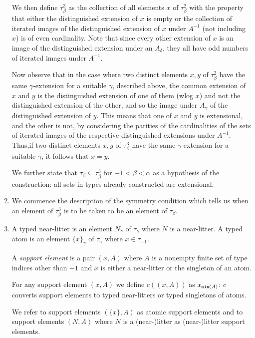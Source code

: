 \documentclass[12pt]{article}
\begin{document}
\begin{enumerate}
We then define $\tau^3_\beta$ as the collection of all elements $x$ of $\tau^2_\beta$ with the property that either the distinguished extension of $x$ is empty or the collection of iterated images of the distinguished extension of
$x$ under $A^{-1}$ (not including $x$) is of even cardinality.  Note that since every other extension of $x$ is an image of the distinguished extension under an $A_\delta$, they all have odd numbers of iterated images under $A^{-1}$.  

Now observe that in the case where two distinct elements $x,y$ of $\tau^2_\beta$ have the same $\gamma$-extension for a suitable $\gamma$, described above,
the common extension of $x$ and $y$ is the distinguished extension of one of them (wlog $x$) and not the distinguished extension of the other, and so the image under $A_\gamma$ of the distinguished extension of $y$.  This means that one of $x$ and $y$ is extensional, and the other is not, by considering the parities of the cardinalities of the sets of iterated images of the respective distinguished extensions under $A^{-1}$.  Thus,if  two distinct elements $x,y$ of $\tau^3_\beta$ have the same $\gamma$-extension for a suitable $\gamma$, it follows that $x=y$.

We further state that $\tau_\beta \subseteq \tau^3_\beta$ for $-1 < \beta < \alpha$ as a hypothesis of the construction:  all sets in types already constructed are extensional.

\item  We commence the description of the symmetry condition which tells us when an element of $\tau^3_\beta$ is to be taken to be an element of $\tau_\beta$.

\item  A typed near-litter is an element $N_\gamma$ of $\tau_\gamma$ where $N$ is a near-litter.  A typed atom is an element $\{x\}_\gamma$ of $\tau_\gamma$ where
$x \in \tau_{-1}$.

A {\em support element\/} is a pair $(x,A)$ where $A$ is a nonempty finite set of type indices other than $-1$ and $x$ is either a near-litter or
the singleton of an atom.

For any support element $(x,A)$ we define $c((x,A))$ as $x_{{\tt min}(A)}$:  $c$ converts support elements to typed near-litters or typed singletons of atoms.

We refer to support elements $(\{x\},A)$ as atomic support elements and to support elements $(N,A)$ where $N$ is a (near-)litter as (near-)litter support elements.


\end{enumerate}
\end{document}
